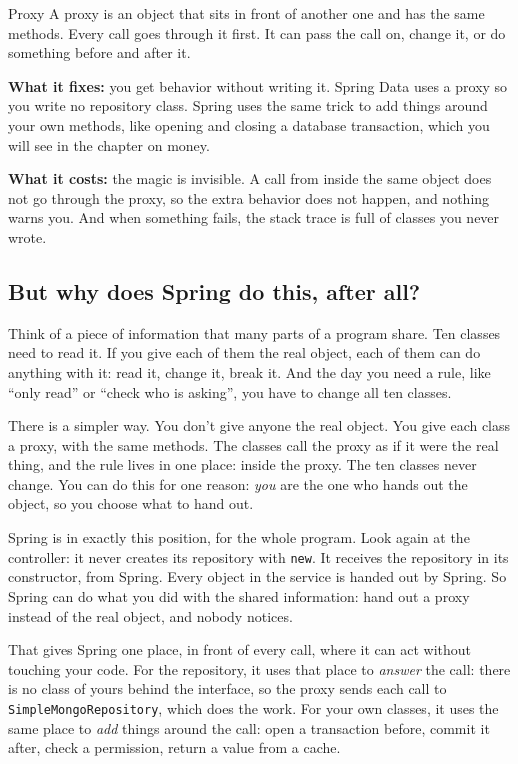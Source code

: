 \begin{concept}{Proxy}
A proxy is an object that sits in front of another one and has the same
methods. Every call goes through it first. It can pass the call on, change
it, or do something before and after it.

\textbf{What it fixes:} you get behavior without writing it. Spring Data uses
a proxy so you write no repository class. Spring uses the same trick to add
things around your own methods, like opening and closing a database
transaction, which you will see in the chapter on money.

\textbf{What it costs:} the magic is invisible. A call from inside the same
object does not go through the proxy, so the extra behavior does not happen,
and nothing warns you. And when something fails, the stack trace is full of
classes you never wrote.
\end{concept}

\subsection*{But why does Spring do this, after all?}

Think of a piece of information that many parts of a program share. Ten
classes need to read it. If you give each of them the real object, each of
them can do anything with it: read it, change it, break it. And the day you
need a rule, like ``only read'' or ``check who is asking'', you have to change
all ten classes.

There is a simpler way. You don't give anyone the real object. You give each
class a proxy, with the same methods. The classes call the proxy as if it
were the real thing, and the rule lives in one place: inside the proxy. The
ten classes never change. You can do this for one reason: \emph{you} are the
one who hands out the object, so you choose what to hand out.

Spring is in exactly this position, for the whole program. Look again at the
controller: it never creates its repository with \texttt{new}. It receives
the repository in its constructor, from Spring. Every object in the service
is handed out by Spring. So Spring can do what you did with the shared
information: hand out a proxy instead of the real object, and nobody notices.

That gives Spring one place, in front of every call, where it can act
without touching your code. For the repository, it uses that place to
\emph{answer} the call: there is no class of yours behind the interface, so
the proxy sends each call to \texttt{SimpleMongoRepository}, which does the
work. For your own classes, it uses the same place to \emph{add} things around
the call: open a transaction before, commit it after, check a permission,
return a value from a cache.


